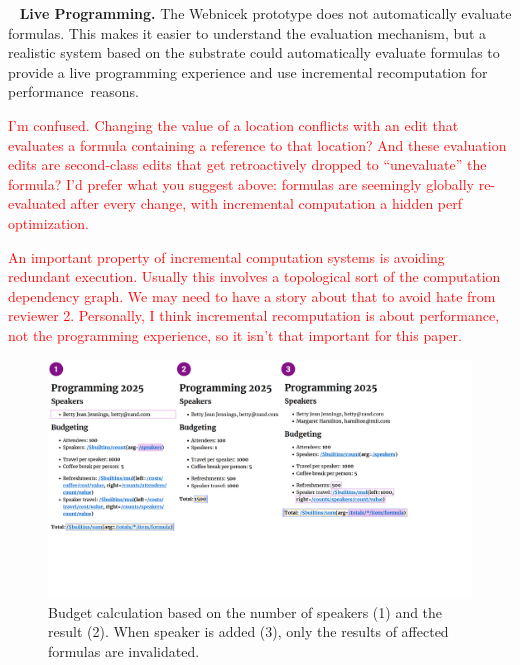 \documentclass[sigconf,anonymous,screen]{acmart}
\newcommand{\note}[1]{\textcolor{red}{#1}}
\DeclareRobustCommand{\keyideabox}[3]{\begin{tcolorbox}[breakable,
  boxsep=5pt,left=0pt,right=0pt,top=0pt,bottom=0pt,width=\dimexpr\columnwidth\relax,
  colback=gray!20,colframe=gray!20,
  enlarge bottom by=0pt,enlarge top by=0pt,
  arc=0pt,outer arc=0pt]
\lettrine[lraise=0.3]{\LARGE #1}{~}
\small \textbf{#2.} #3
\end{tcolorbox}
}
\begin{document}
\keyideabox{\faRefresh}{Live Programming}{The Webnicek prototype does not automatically
evaluate formulas. This makes it easier to understand the evaluation
mechanism, but a realistic system based on the substrate could automatically evaluate
formulas to provide a live programming experience \cite{petricek-2020-foundations,rein-2019-live}
and use incremental recomputation for performance~reasons.}

\note{I'm confused. Changing the value of a location conflicts with an edit that evaluates a formula containing a reference to that location? And these evaluation edits are second-class edits that get retroactively dropped to ``unevaluate'' the formula? I'd prefer what you suggest above: formulas are seemingly globally re-evaluated after every change, with incremental computation a hidden perf optimization. }

\note{An important property of incremental computation systems is avoiding redundant execution. Usually this involves a topological sort of the computation dependency graph. We may need to have a story about that to avoid hate from reviewer 2. Personally, I think incremental recomputation is about performance, not the programming experience, so it isn't that important for this paper. }



\begin{figure}[t]
  \includegraphics[width=1\columnwidth,clip,trim=0.1cm 5cm 5.1cm 0cm]{fig/incremental.pdf}
  \vspace{-1em}
  \caption{Budget calculation based on the number of speakers (1) and the result (2). When speaker
  is added (3), only the results of affected formulas are invalidated.}
  \label{fig:incremental}
  \vspace{-1em}
\end{figure}
\end{document}
